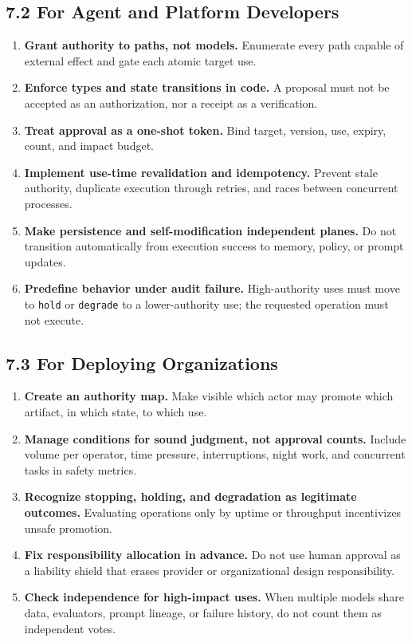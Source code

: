 \subsection{7.2 For Agent and Platform Developers}\label{for-agent-and-platform-developers}

\begin{enumerate}
\def\labelenumi{\arabic{enumi}.}
\tightlist
\item
  \textbf{Grant authority to paths, not models.} Enumerate every path capable of external effect and gate each atomic target use.
\item
  \textbf{Enforce types and state transitions in code.} A proposal must not be accepted as an authorization, nor a receipt as a verification.
\item
  \textbf{Treat approval as a one-shot token.} Bind target, version, use, expiry, count, and impact budget.
\item
  \textbf{Implement use-time revalidation and idempotency.} Prevent stale authority, duplicate execution through retries, and races between concurrent processes.
\item
  \textbf{Make persistence and self-modification independent planes.} Do not transition automatically from execution success to memory, policy, or prompt updates.
\item
  \textbf{Predefine behavior under audit failure.} High-authority uses must move to \passthrough{\lstinline!hold!} or \passthrough{\lstinline!degrade!} to a lower-authority use; the requested operation must not execute.
\end{enumerate}

\subsection{7.3 For Deploying Organizations}\label{for-deploying-organizations}

\begin{enumerate}
\def\labelenumi{\arabic{enumi}.}
\tightlist
\item
  \textbf{Create an authority map.} Make visible which actor may promote which artifact, in which state, to which use.
\item
  \textbf{Manage conditions for sound judgment, not approval counts.} Include volume per operator, time pressure, interruptions, night work, and concurrent tasks in safety metrics.
\item
  \textbf{Recognize stopping, holding, and degradation as legitimate outcomes.} Evaluating operations only by uptime or throughput incentivizes unsafe promotion.
\item
  \textbf{Fix responsibility allocation in advance.} Do not use human approval as a liability shield that erases provider or organizational design responsibility.
\item
  \textbf{Check independence for high-impact uses.} When multiple models share data, evaluators, prompt lineage, or failure history, do not count them as independent votes.
\end{enumerate}

